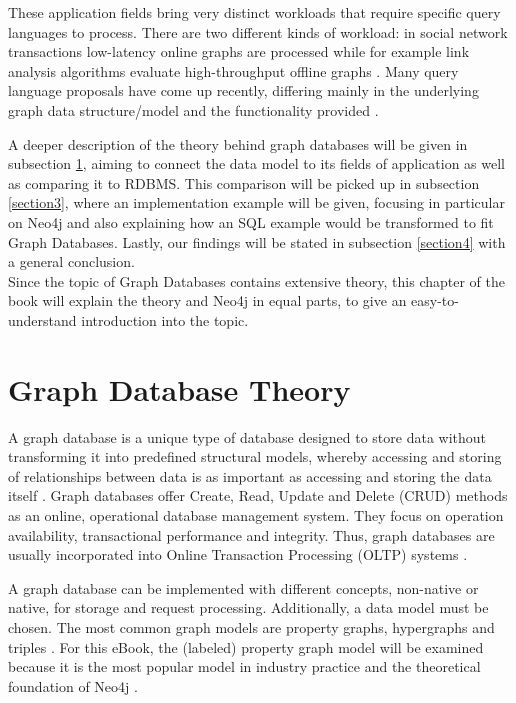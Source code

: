 These application fields bring very distinct workloads that require specific query languages to process. There are two different kinds of workload: in social network transactions low-latency online graphs are processed while for example link analysis algorithms evaluate high-throughput offline graphs \autocite{Angles2018AnIT}. Many query language proposals have come up recently, differing mainly in the underlying graph data structure/model and the functionality provided \autocite{Wood2012QueryLF}.

A deeper description of the theory behind graph databases will be given in subsection \ref{section2}, aiming to connect the data model to its fields of application as well as comparing it to RDBMS. This comparison will be picked up in subsection \ref{section3}, where an implementation example will be given, focusing in particular on Neo4j and also explaining how an SQL example would be transformed to fit Graph Databases. Lastly, our findings will be stated in subsection \ref{section4} with a general conclusion. \\ 
Since the topic of Graph Databases contains extensive theory, this chapter of the book will explain the theory and Neo4j in equal parts, to give an easy-to-understand introduction into the topic.




\section{Graph Database Theory} \label{section2}
A graph database is a unique type of database designed to store data without transforming it into predefined structural models, whereby accessing and storing of relationships between data is as important as accessing and storing the data itself \autocite{neo4j:graphdb}. Graph databases offer Create, Read, Update and Delete (CRUD) methods as an online, operational database management system. They focus on operation availability, transactional performance and integrity. Thus, graph databases are usually incorporated into Online Transaction Processing (OLTP) systems \autocite{graphdb2015}.

A graph database can be implemented with different concepts, non-native or native, for storage and request processing. Additionally, a data model must be chosen. The most common graph models are property graphs, hypergraphs and triples \autocite{graphdb2015}. For this eBook, the (labeled) property graph model will be examined because it is the most popular model in industry practice \autocite{graphdb2015} and the theoretical foundation of Neo4j \autocite{maheshlal2015}.


